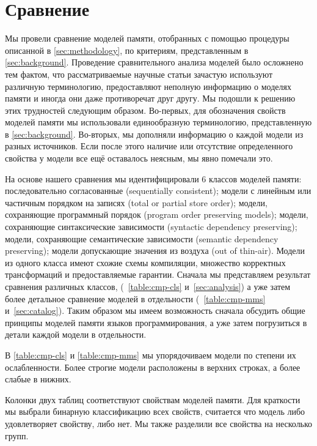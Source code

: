 \section{Сравнение}
\label{sec:comparison}

Мы провели сравнение моделей памяти, 
отобранных с помощью процедуры описанной в \cref{sec:methodology},
по критериям, представленным в \cref{sec:background}. 
Проведение сравнительного анализа моделей было 
осложнено тем фактом, что рассматриваемые 
научные статьи зачастую используют различную терминологию, 
предоставляют неполную информацию о моделях памяти 
и иногда они даже противоречат друг другу. 
Мы подошли к решению этих трудностей следующим образом. 
Во-первых, для обозначения свойств моделей памяти
мы использовали единообразную терминологию,
представленную в \cref{sec:background}.
Во-вторых, мы дополняли информацию о каждой модели 
из разных источников. Если после этого 
наличие или отсутствие определенного свойства у модели 
все ещё оставалось неясным, мы явно помечали это. 

На основе нашего сравнения мы идентифицировали 6 классов моделей памяти:
последовательно согласованные (sequentially consistent); 
модели с линейным или частичным порядком на записях
(total or partial store order);
модели, сохраняющие программный порядок
(program order preserving models); 
модели, сохраняющие синтаксические зависимости 
(syntactic dependency preserving);
модели, сохраняющие семантические зависимости
(semantic dependency preserving);
модели допускающие значения из воздуха
(out of thin-air). 
Модели из одного класса имеют схожие схемы компиляции, 
множество корректных трансформаций и предоставляемые гарантии. 
Сначала мы представляем результат сравнения различных классов, 
(\see~\cref{table:cmp-cls} и~\cref{sec:analysis})
а уже затем более детальное сравнение моделей в отдельности
(\see~\cref{table:cmp-mms} и~\cref{sec:catalog}).
Таким образом мы имеем возможность сначала обсудить общие 
принципы моделей памяти языков программирования, 
а уже затем погрузиться в детали каждой модели в отдельности. 



В \cref{table:cmp-cls} и \cref{table:cmp-mms} 
мы упорядочиваем модели по степени их ослабленности. 
Более строгие модели расположены в верхних строках, 
а более слабые в нижних.  

Колонки двух таблиц соответствуют свойствам моделей памяти.
Для краткости мы выбрали бинарную классификацию всех свойств,
\ie считается что модель либо удовлетворяет свойству, либо нет. 
Мы также разделили все свойства на несколько групп. 

